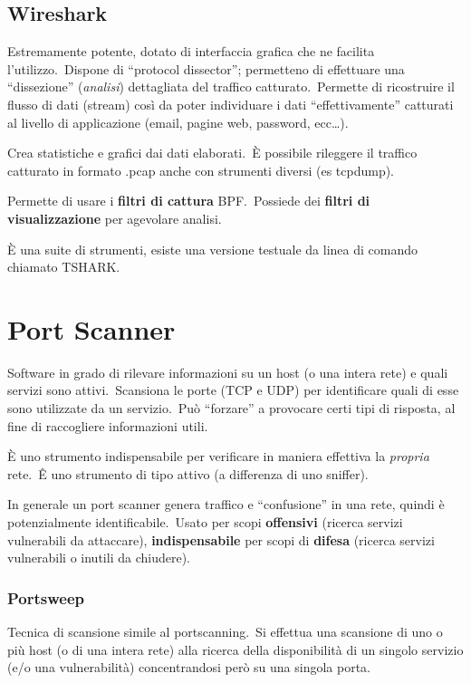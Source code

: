 \subsection{Wireshark}

Estremamente potente, dotato di interfaccia grafica che ne facilita l’utilizzo.\
Dispone di ``protocol dissector''; permetteno di effettuare
una ``dissezione'' (\emph{analisi}) dettagliata del traffico catturato.\
Permette di ricostruire il flusso di dati (stream) così da poter individuare i dati ``effettivamente'' catturati al livello di applicazione (email, pagine web, password, ecc\dots).

Crea statistiche e grafici dai dati elaborati.\
È possibile rileggere il traffico catturato in formato .pcap anche con strumenti diversi (es tcpdump).

Permette di usare i \textbf{filtri di cattura} BPF.\
Possiede dei \textbf{filtri di visualizzazione} per agevolare analisi.

È una suite di strumenti, esiste una versione testuale da linea di comando chiamato TSHARK.

\section{Port Scanner}

Software in grado di rilevare informazioni su un host (o una intera rete) e quali servizi sono attivi.\
Scansiona le porte (TCP e UDP) per identificare quali di esse sono utilizzate da un servizio.\
Può ``forzare'' a provocare certi tipi di risposta, al fine di raccogliere informazioni utili.

È uno strumento indispensabile per verificare in
maniera effettiva la \emph{propria} rete.\
Ê uno strumento di tipo attivo (a differenza di uno
sniffer).

In generale un port scanner genera traffico e ``confusione'' in una rete, quindi è potenzialmente identificabile.\
Usato per scopi \textbf{offensivi} (ricerca servizi vulnerabili
da attaccare), \textbf{indispensabile} per scopi di \textbf{difesa} (ricerca servizi vulnerabili o inutili da chiudere).

\subsubsection{Portsweep}

Tecnica di scansione simile al portscanning.\
Si effettua una scansione di uno o più host (o di una intera rete) alla ricerca della disponibilità di un singolo servizio (e/o una vulnerabilità) concentrandosi però su una singola porta.

